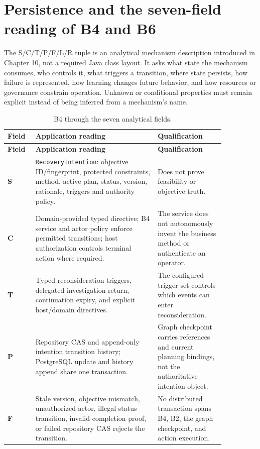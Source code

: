 \section{Persistence and the seven-field reading of B4 and B6}
\label{sec:ch23-seven-field-reading}

The S/C/T/P/F/L/R tuple is an analytical mechanism description introduced in Chapter 10, not a required Java class layout. It asks what state the mechanism consumes, who controls it, what triggers a transition, where state persists, how failure is represented, how learning changes future behavior, and how resources or governance constrain operation. Unknown or conditional properties must remain explicit instead of being inferred from a mechanism's name.

\begin{longtable}{@{}>{\raggedright\arraybackslash}p{0.10\linewidth} >{\raggedright\arraybackslash}p{0.49\linewidth} >{\raggedright\arraybackslash}p{0.27\linewidth}@{}}
\caption{B4 through the seven analytical fields.}\label{tab:ch23-b4-seven-fields}\\
\toprule
\textbf{Field} & \textbf{Application reading} & \textbf{Qualification} \\
\midrule
\endfirsthead
\toprule
\textbf{Field} & \textbf{Application reading} & \textbf{Qualification} \\
\midrule
\endhead
\textbf{S} & \texttt{RecoveryIntention}: objective ID/fingerprint, protected constraints, method, active plan, status, version, rationale, triggers and authority policy. & Does not prove feasibility or objective truth. \\
\textbf{C} & Domain-provided typed directive; B4 service and actor policy enforce permitted transitions; host authorization controls terminal action where required. & The service does not autonomously invent the business method or authenticate an operator. \\
\textbf{T} & Typed reconsideration triggers, delegated investigation return, continuation expiry, and explicit host/domain directives. & The configured trigger set controls which events can enter reconsideration. \\
\textbf{P} & Repository CAS and append-only intention transition history; PostgreSQL update and history append share one transaction. & Graph checkpoint carries references and current planning bindings, not the authoritative intention object. \\
\textbf{F} & Stale version, objective mismatch, unauthorized actor, illegal status transition, invalid completion proof, or failed repository CAS rejects the transition. & No distributed transaction spans B4, B2, the graph checkpoint, and action execution. \\

\end{longtable}
